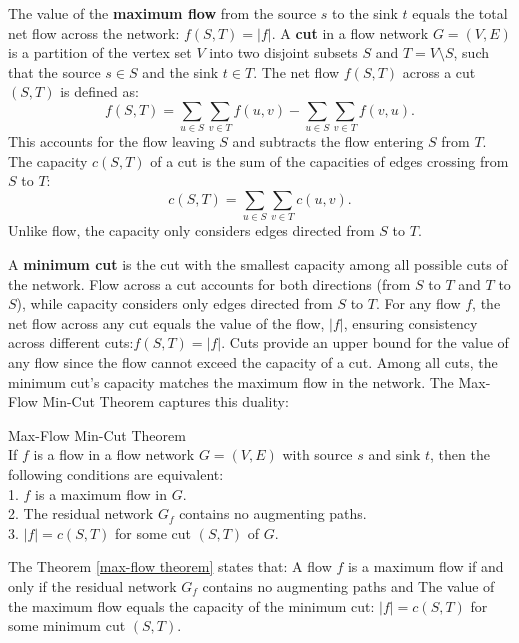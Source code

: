 \noindent The value of the \textbf{maximum flow} from the source $s$ to the sink $t$ equals the total net flow across the network:
$f(S, T) = |f|$. A \textbf{cut} in a flow network $G = (V, E)$ is a partition of the vertex set $V$ into two disjoint subsets $S$ and $T = V \setminus S$, such that the source $s \in S$ and the sink $t \in T$. The net flow $f(S, T)$ across a cut $(S, T)$ is defined as:
\[
f(S, T) = \sum_{u \in S} \sum_{v \in T} f(u, v) - \sum_{u \in S} \sum_{v \in T} f(v, u).
\]
This accounts for the flow leaving $S$ and subtracts the flow entering $S$ from $T$. The capacity $c(S, T)$ of a cut is the sum of the capacities of edges crossing from $S$ to $T$:
\[
c(S, T) = \sum_{u \in S} \sum_{v \in T} c(u, v).
\]
Unlike flow, the capacity only considers edges directed from $S$ to $T$.

\noindent A \textbf{minimum cut} is the cut with the smallest capacity among all possible cuts of the network. Flow across a cut accounts for both directions (from $S$ to $T$ and $T$ to $S$), while capacity considers only edges directed from $S$ to $T$. For any flow $f$, the net flow across any cut equals the value of the flow, $|f|$, ensuring consistency across different cuts:$f(S, T) = |f|.$
\noindent Cuts provide an upper bound for the value of any flow since the flow cannot exceed the capacity of a cut. Among all cuts, the minimum cut's capacity matches the maximum flow in the network. The Max-Flow Min-Cut Theorem captures this duality:

\begin{theorem} {Max-Flow Min-Cut Theorem} \label{max-flow theorem}\\
If $f$ is a flow in a flow network $G = (V, E)$  with source $s$ and sink $t$, then the
following conditions are equivalent:\\
1. $f$ is a maximum flow in $G$.\\
2. The residual network $G_f$ contains no augmenting paths.\\
3. $|f| = c(S, T)$ for some cut $(S, T)$ of $G$.
\end{theorem}

\noindent The Theorem \ref{max-flow theorem} states that: A flow $f$ is a maximum flow if and only if the residual network $G_f$ contains no augmenting paths and The value of the maximum flow equals the capacity of the minimum cut: $|f| = c(S, T)$ for some minimum cut $(S, T)$.

